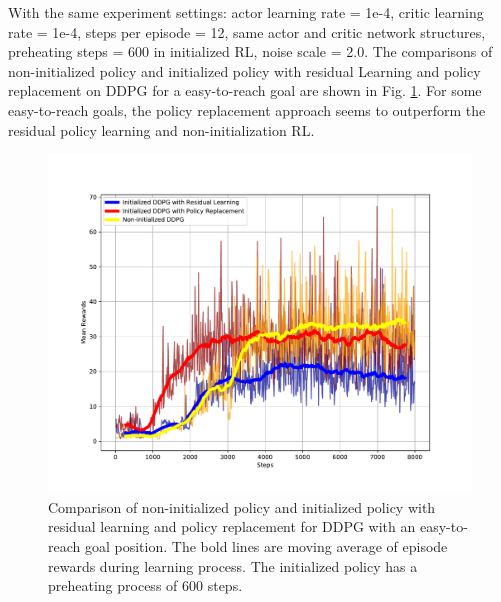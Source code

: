 \documentclass{article}
\begin{document}
With the same experiment settings: actor learning rate = 1e-4, critic learning rate = 1e-4, steps per episode = 12, same actor and critic network structures, preheating steps = 600 in initialized RL, noise scale = 2.0. The comparisons of non-initialized policy and initialized policy with residual Learning and policy replacement on DDPG for a easy-to-reach goal are shown in Fig. \ref{fig:rpl2}. For some easy-to-reach goals, the policy replacement approach seems to outperform the residual policy learning and non-initialization RL.
\begin{figure}[htbp]
	\centering
	\includegraphics[scale=0.5]{img/res_ddpg3.pdf}
	\caption{Comparison of non-initialized policy and initialized policy with residual learning and policy replacement for DDPG with an easy-to-reach goal position. The bold lines are moving average of episode rewards during learning process. The initialized policy has a preheating process of 600 steps.}
	\label{fig:rpl2}
\end{figure}
\end{document}
